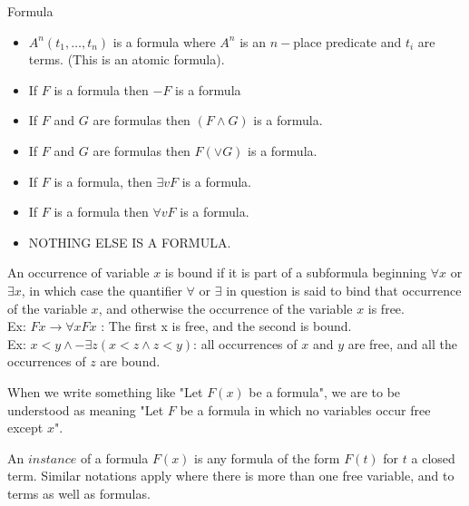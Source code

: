 \begin{definition}Formula
\begin{itemize}
\item $A^n(t_1,\dots,t_n)$ is a formula where $A^n$ is an $n-$place predicate and $t_i$ are terms. (This is an atomic formula).
\item If $F$ is a formula then $-F$ is a formula
\item If $F$ and $G$ are formulas then $(F\wedge G)$ is a formula.
\item If $F$ and $G$ are formulas then $F(\vee G)$ is a formula.
\item If $F$ is a formula, then $\exists vF$ is a formula.
\item If $F$ is a formula then $\forall vF$ is a formula.
\item NOTHING ELSE IS A FORMULA.
\end{itemize}
\end{definition}


\begin{definition}[Bound]

An occurrence of variable $x$ is bound if it is part of a subformula beginning $\forall x$ or $\exists x$, in which case the quantifier $\forall$ or $\exists$ in question is said to bind that occurrence of the variable $x$, and otherwise the occurrence of the variable $x$ is free. \\
Ex: $Fx \rightarrow \forall x F x$ : The first x is free, and the second is bound. \\
Ex: $x < y \wedge - \exists z ( x < z \wedge z < y )$: all occurrences of $x$ and $y$ are free, and all the occurrences of $z$ are bound.
\end{definition}

\begin{remark}
When we write something like "Let $F(x)$ be a formula", we are to be understood as meaning "Let $F$ be a formula in which no variables occur free except $x$".
\end{remark}

\begin{definition}[Instance]
An $instance$ of a formula $F(x)$ is any formula of the form $F(t)$ for $t$ a closed term. Similar notations apply where there is more than one free variable, and to terms as well as formulas.
\end{definition}

